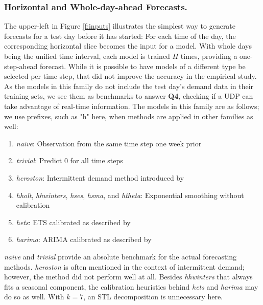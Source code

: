 \subsubsection{Horizontal and Whole-day-ahead Forecasts.}
\label{hori}

The upper-left in Figure \ref{f:inputs} illustrates the simplest way to
    generate forecasts for a test day before it has started:
For each time of the day, the corresponding horizontal slice becomes the input
    for a model.
With whole days being the unified time interval, each model is trained $H$
    times, providing a one-step-ahead forecast.
While it is possible to have models of a different type be selected per time
    step, that did not improve the accuracy in the empirical study.
As the models in this family do not include the test day's demand data in
    their training sets, we see them as benchmarks to answer \textbf{Q4},
    checking if a UDP can take advantage of real-time information.
The models in this family are as follows; we use prefixes, such as "h" here,
    when methods are applied in other families as well:
\begin{enumerate}
\item \textit{\gls{naive}}:
          Observation from the same time step one week prior
\item \textit{\gls{trivial}}:
          Predict $0$ for all time steps
\item \textit{\gls{hcroston}}:
          Intermittent demand method introduced by \cite{croston1972}
\item \textit{\gls{hholt}},
      \textit{\gls{hhwinters}},
      \textit{\gls{hses}},
      \textit{\gls{hsma}}, and
      \textit{\gls{htheta}}:
          Exponential smoothing without calibration
\item \textit{\gls{hets}}:
          ETS calibrated as described by \cite{hyndman2008b}
\item \textit{\gls{harima}}:
          ARIMA calibrated as described by \cite{hyndman2008a}
\end{enumerate}
\textit{naive} and \textit{trivial} provide an absolute benchmark for the
    actual forecasting methods.
\textit{hcroston} is often mentioned in the context of intermittent demand;
    however, the method did not perform well at all.
Besides \textit{hhwinters} that always fits a seasonal component, the
    calibration heuristics behind \textit{hets} and \textit{harima} may do so
    as well.
With $k=7$, an STL decomposition is unnecessary here.
